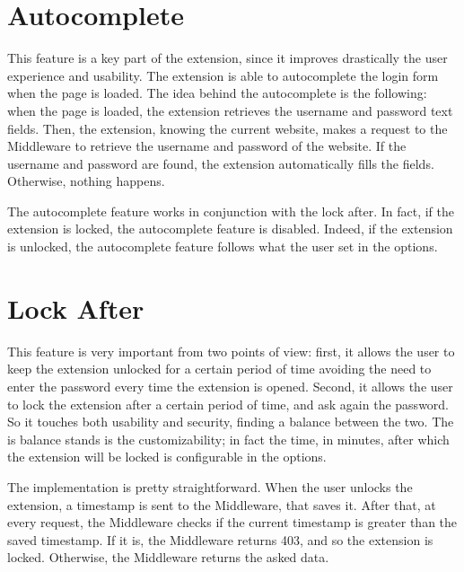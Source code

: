 \section{Autocomplete}

This feature is a key part of the extension, since it improves drastically the user experience and usability. The extension is able to autocomplete the login form when the page is loaded. 
The idea behind the autocomplete is the following: when the page is loaded, the extension retrieves the username and password text fields. Then, the extension, knowing the current website, makes a request to the Middleware to retrieve the username and password of the website. If the username and password are found, the extension automatically fills the fields. Otherwise, nothing happens.

The autocomplete feature works in conjunction with the lock after. In fact, if the extension is locked, the autocomplete feature is disabled. Indeed, if the extension is unlocked, the autocomplete feature follows what the user set in the options.
\section{Lock After}

This feature is very important from two points of view: first, it allows the user to keep the extension unlocked for a certain period of time avoiding the need to enter the password every time the extension is opened. Second, it allows the user to lock the extension after a certain period of time, and ask again the password. So it touches both usability and security, finding a balance between the two. The is balance stands is the customizability; in fact the time, in minutes, after which the extension will be locked is configurable in the options. 

The implementation is pretty straightforward. When the user unlocks the extension, a timestamp is sent to the Middleware, that saves it. After that, at every request, the Middleware checks if the current timestamp is greater than the saved timestamp. If it is, the Middleware returns 403, and so the extension is locked. Otherwise, the Middleware returns the asked data. 
